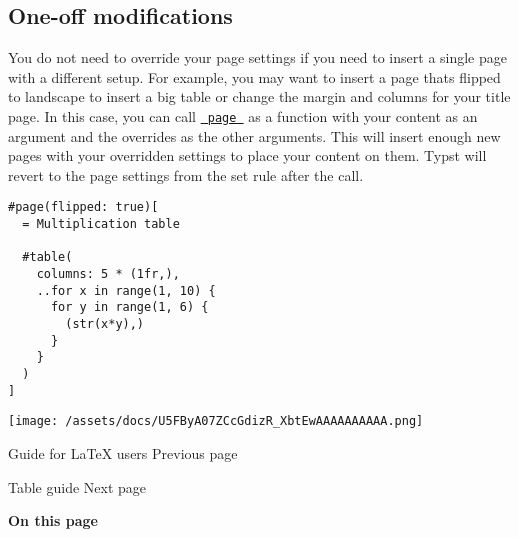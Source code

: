 \subsection{One-off modifications}\label{one-off-modifications}

You do not need to override your page settings if you need to insert a
single page with a different setup. For example, you may want to insert
a page that\textquotesingle s flipped to landscape to insert a big table
or change the margin and columns for your title page. In this case, you
can call \href{/docs/reference/layout/page/}{\texttt{\ page\ }} as a
function with your content as an argument and the overrides as the other
arguments. This will insert enough new pages with your overridden
settings to place your content on them. Typst will revert to the page
settings from the set rule after the call.

\begin{verbatim}
#page(flipped: true)[
  = Multiplication table

  #table(
    columns: 5 * (1fr,),
    ..for x in range(1, 10) {
      for y in range(1, 6) {
        (str(x*y),)
      }
    }
  )
]
\end{verbatim}

\texttt{[image: /assets/docs/U5FByA07ZCcGdizR\_XbtEwAAAAAAAAAA.png]}

\href{/docs/guides/guide-for-latex-users/}{\pandocbounded{}}

{ Guide for LaTeX users } { Previous page }

\href{/docs/guides/table-guide/}{\pandocbounded{}}

{ Table guide } { Next page }

\textbf{On this page}

